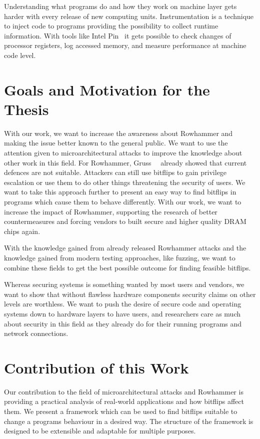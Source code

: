 Understanding what programs do and how they work on machine layer gets harder
with every release of new computing units. Instrumentation is a technique to
inject code to programs providing the possibility to collect runtime
information. With tools like Intel Pin~\cite{pintool} it gets possible to check
changes of processor registers, log accessed memory, and measure performance at
machine code level.

\section{Goals and Motivation for the Thesis}

With our work, we want to increase the awareness about Rowhammer and making the
issue better known to the general public. We want to use the attention given to
microarchitectural attacks to improve the knowledge about other work in this
field. For Rowhammer, Gruss~\etal~\cite{flipinthewall} already showed that
current defences are not suitable. Attackers can still use bitflips to gain
privilege escalation or use them to do other things threatening the security of
users. We want to take this approach further to present an easy way to find
bitflips in programs which cause them to behave differently. With our work, we
want to increase the impact of Rowhammer, supporting the research of better
countermeasures and forcing vendors to built secure and higher quality DRAM
chips again.

With the knowledge gained from already released Rowhammer attacks and the
knowledge gained from modern testing approaches, like fuzzing, we want to
combine these fields to get the best possible outcome for finding feasible
bitflips.

Whereas securing systems is something wanted by most users and vendors, we want
to show that without flawless hardware components security claims on other
levels are worthless. We want to push the desire of secure code and operating
systems down to hardware layers to have users, and researchers care as much
about security in this field as they already do for their running programs and
network connections.

\section{Contribution of this Work}

Our contribution to the field of microarchitectural attacks and Rowhammer is
providing a practical analysis of real-world applications and how bitflips
affect them. We present a framework which can be used to find bitflips suitable
to change a program\textquotesingle s behaviour in a desired way. The structure
of the framework is designed to be extensible and adaptable for multiple
purposes.

